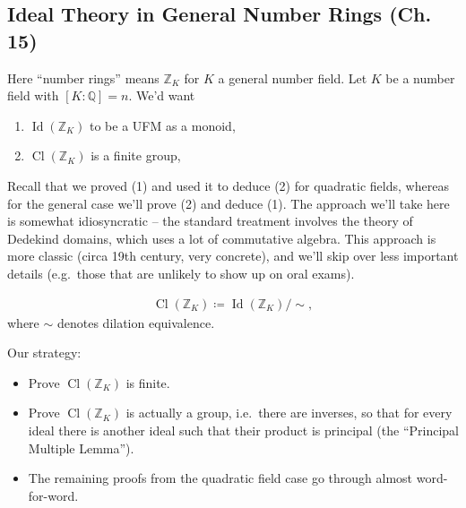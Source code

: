 \hypertarget{ideal-theory-in-general-number-rings-ch.-15}{%
\subsection{Ideal Theory in General Number Rings (Ch.
15)}\label{ideal-theory-in-general-number-rings-ch.-15}}

\begin{remark}

Here ``number rings'' means \({\mathbb{Z}}_K\) for \(K\) a general
number field. Let \(K\) be a number field with
\([K: {\mathbb{Q}}] = n\). We'd want

\begin{enumerate}
\def\labelenumi{\arabic{enumi}.}
\tightlist
\item
  \(\operatorname{Id}({\mathbb{Z}}_K)\) to be a UFM as a monoid,
\item
  \(\operatorname{Cl}({\mathbb{Z}}_K)\) is a finite group,
\end{enumerate}

Recall that we proved (1) and used it to deduce (2) for quadratic
fields, whereas for the general case we'll prove (2) and deduce (1). The
approach we'll take here is somewhat idiosyncratic -- the standard
treatment involves the theory of Dedekind domains, which uses a lot of
commutative algebra. This approach is more classic (circa 19th century,
very concrete), and we'll skip over less important details (e.g.~those
that are unlikely to show up on oral exams).

\end{remark}

\begin{definition}

\begin{align*}
\operatorname{Cl}({\mathbb{Z}}_K) \coloneqq\operatorname{Id}({\mathbb{Z}}_K)/ \sim
,\end{align*}
where \(\sim\) denotes dilation equivalence.

\end{definition}

\begin{remark}

Our strategy:

\begin{itemize}
\tightlist
\item
  Prove \(\operatorname{Cl}({\mathbb{Z}}_K)\) is finite.
\item
  Prove \(\operatorname{Cl}({\mathbb{Z}}_K)\) is actually a group,
  i.e.~there are inverses, so that for every ideal there is another
  ideal such that their product is principal (the ``Principal Multiple
  Lemma'').
\item
  The remaining proofs from the quadratic field case go through almost
  word-for-word.
\end{itemize}

\end{remark}

